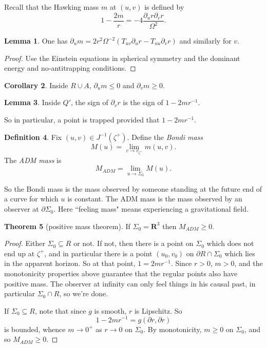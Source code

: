 \documentclass[12pt]{report}
\newcommand{\RR}{\mathbf{R}}
\newcommand{\dfn}[1]{\emph{#1}\index{#1}}
\theoremstyle{definition}
\newtheorem{theorem}{Theorem}[chapter]
\newtheorem{lemma}[theorem]{Lemma}
\newtheorem{corollary}[theorem]{Corollary}
\newtheorem{definition}[theorem]{Definition}
\theoremstyle{remark}
\begin{document}
Recall that the Hawking mass $m$ at $(u, v)$ is defined by
$$1 - \frac{2m}{r} = -4 \frac{\partial_ur\partial_vr}{\Omega^2}.$$
\begin{lemma}
    One has $\partial_um = 2r^2\Omega^{-2} (T_{uv}\partial_ur - T_{uu}\partial_vr)$ and similarly for $v$.
\end{lemma}
\begin{proof}
    Use the Einstein equations in spherical symmetry and the dominant energy and no-antitrapping conditions.
\end{proof}
\begin{corollary}
    Inside $R \cup A$, $\partial_um \leq 0$ and $\partial_vm \geq 0$.
\end{corollary}
\begin{lemma}
    Inside $Q'$, the sign of $\partial_vr$ is the sign of $1 - 2mr^{-1}$.
\end{lemma}
    So in particular, a point is trapped provided that $1 - 2mr^{-1}$.
\begin{definition}
    Fix $(u, v) \in J^{-1}(\zeta^+)$. Define the \dfn{Bondi mass}
    $$M(u) = \lim_{v \to v_{\zeta^+}} m(u, v).$$
    The \dfn{ADM mass} is
    $$M_{ADM} = \lim_{u \to \Sigma_0} M(u).$$
\end{definition}
    So the Bondi mass is the mass observed by someone standing at the future end of a curve for which $u$ is constant. The ADM mass is the mass observed by an observer at $\partial \Sigma_0$. Here ``feeling mass" means experiencing a gravitational field.
\begin{theorem}[positive mass theorem]
    If $\Sigma_0 = \RR^3$ then $M_{ADM} \geq 0$.
\end{theorem}
\begin{proof}
    Either $\Sigma_0 \subseteq R$ or not. If not, then there is a point on $\Sigma_0$ which does not end up at $\zeta^+$, and in particular there is a point $(u_0, v_0)$ on $\partial R \cap \Sigma_0$ which lies in the apparent horizon. So at that point, $1 = 2mr^{-1}$. Since $r > 0$, $m > 0$, and the monotonicity properties above guarantee that the regular points also have positive mass. The observer at infinity can only feel things in his causal past, in particular $\Sigma_0 \cap R$, so we're done.

    If $\Sigma_0 \subseteq R$, note that since $g$ is smooth, $r$ is Lipschitz. So
    $$1 - 2mr^{-1} = g(\partial r, \partial r)$$
    is bounded, whence $m \to 0^+$ as $r \to 0$ on $\Sigma_0$. By monotonicity, $m \geq 0$ on $\Sigma_0$, and so $M_{ADM} \geq 0$.
\end{proof}
\end{document}
